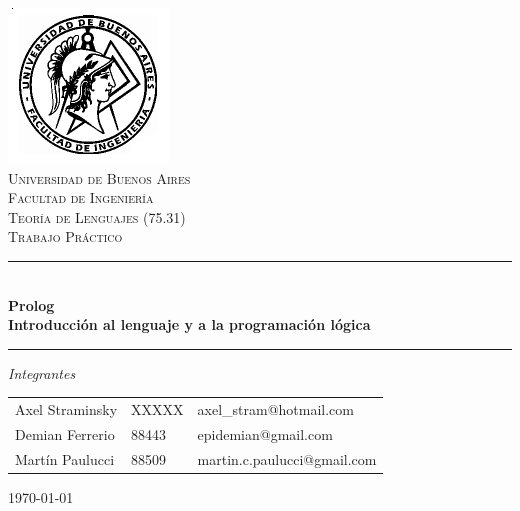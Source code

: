 \documentclass[12pt,titlepage]{article}
\begin{document}
\begin{titlepage}

\thispagestyle{empty}

\begin{center}
\includegraphics[scale=0.55]{./fiuba}\\
\textsc{\Large Universidad de Buenos Aires}\\[0.2cm]
\textsc{\Large Facultad de Ingeniería}\\[1.5cm]


\textsc{\large Teoría de Lenguajes (75.31)} \\[0.3cm]
\textsc{\large Trabajo Práctico} \\[0.5cm]

\rule{\linewidth}{0.5mm} \\[0.4cm]
{\huge \bfseries Prolog} \\[0.3cm]
{\Large \bfseries Introducción al lenguaje y a la programación lógica}
\rule{\linewidth}{0.5mm} 

\vfill

\begin{flushleft}
\Large\emph{Integrantes} \\[0.2cm]


\begin{tabular}{lll}
Axel Straminsky & XXXXX & axel\_stram@hotmail.com \\
Demian Ferrerio & 88443 & epidemian@gmail.com \\
Martín Paulucci & 88509 & martin.c.paulucci@gmail.com \\
\end{tabular}
\end{flushleft}

{\Large \today}

\end{center}
\end{titlepage}

\end{document}
